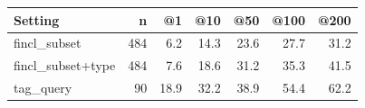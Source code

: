\begin{tabular}{lrrrrrr}
\toprule
Setting & n & @1 & @10 & @50 & @100 & @200 \\
\midrule
fincl\_subset & 484 & 6.2 & 14.3 & 23.6 & 27.7 & 31.2 \\
fincl\_subset+type & 484 & 7.6 & 18.6 & 31.2 & 35.3 & 41.5 \\
tag\_query & 90 & 18.9 & 32.2 & 38.9 & 54.4 & 62.2 \\
\bottomrule
\end{tabular}
